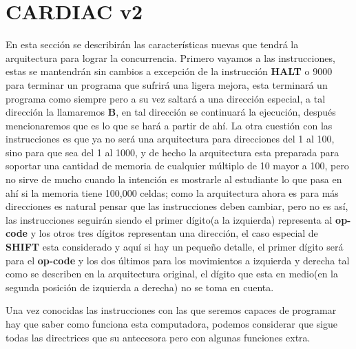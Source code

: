 \documentclass[12pt]{article}
\begin{document}
	\section{CARDIAC v2}
	
	En esta sección se describirán las características nuevas que tendrá la arquitectura para lograr la concurrencia. Primero vayamos a
	las instrucciones, estas se mantendrán sin cambios a excepción de la instrucción \textbf{HALT} o $9000$ para terminar un programa que
	sufrirá una ligera mejora, esta terminará un programa como siempre pero a su vez saltará a una dirección especial, a tal
	dirección la llamaremos \textbf{B}, en tal dirección se continuará la ejecución, después mencionaremos que es lo que se hará a partir
	de ahí. La otra cuestión con las instrucciones es que ya no será una arquitectura para direcciones del 1 al 100, sino para
	que sea del 1 al 1000, y de hecho la arquitectura esta preparada para soportar una cantidad de memoria de cualquier múltiplo de 10 mayor
	a 100, pero no sirve de mucho cuando la intención es mostrarle al estudiante lo que pasa en ahí si la memoria tiene
	100,000 celdas; como la arquitectura ahora es para más direcciones es natural pensar que las instrucciones deben cambiar, pero no es
	así, las instrucciones seguirán siendo el primer dígito(a la izquierda) representa al \textbf{op-code} y los otros
	tres dígitos representan una dirección, el caso especial de \textbf{SHIFT} esta considerado y aquí si hay un pequeño detalle,
	el primer dígito será para el \textbf{op-code} y los dos últimos para los movimientos a izquierda y derecha tal como
	se describen en la arquitectura original, el dígito que esta en medio(en la segunda posición de izquierda a derecha) no
	se toma en cuenta.
	
	Una vez conocidas las instrucciones con las que seremos capaces de programar hay que saber como funciona esta computadora, podemos
	considerar que sigue todas las directrices que su antecesora pero con algunas funciones extra.
	
\end{document}
